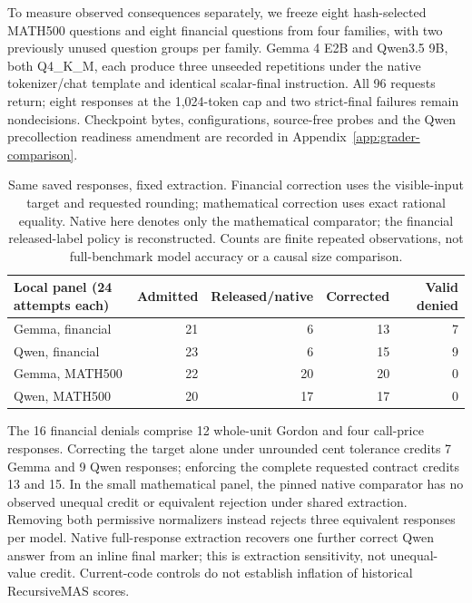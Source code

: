 To measure observed consequences separately, we freeze eight hash-selected MATH500 questions and eight financial questions from four families, with two previously unused question groups per family. Gemma 4 E2B and Qwen3.5 9B, both Q4\_K\_M, each produce three unseeded repetitions under the native tokenizer/chat template and identical scalar-final instruction. All 96 requests return; eight responses at the 1,024-token cap and two strict-final failures remain nondecisions. Checkpoint bytes, configurations, source-free probes and the Qwen precollection readiness amendment are recorded in Appendix~\ref{app:grader-comparison}.

\begin{table}[!ht]
\centering\small
\begin{tabular}{lrrrr}
\toprule
Local panel (24 attempts each) & Admitted & Released/native & Corrected & Valid denied\\
\midrule
Gemma, financial & 21 & 6 & 13 & 7\\
Qwen, financial & 23 & 6 & 15 & 9\\
Gemma, MATH500 & 22 & 20 & 20 & 0\\
Qwen, MATH500 & 20 & 17 & 17 & 0\\
\bottomrule
\end{tabular}
\caption{Same saved responses, fixed extraction. Financial correction uses the visible-input target and requested rounding; mathematical correction uses exact rational equality. Native here denotes only the mathematical comparator; the financial released-label policy is reconstructed. Counts are finite repeated observations, not full-benchmark model accuracy or a causal size comparison.}
\label{tab:local-comparison}
\end{table}

The 16 financial denials comprise 12 whole-unit Gordon and four call-price responses. Correcting the target alone under unrounded cent tolerance credits 7 Gemma and 9 Qwen responses; enforcing the complete requested contract credits 13 and 15. In the small mathematical panel, the pinned native comparator has no observed unequal credit or equivalent rejection under shared extraction. Removing both permissive normalizers instead rejects three equivalent responses per model. Native full-response extraction recovers one further correct Qwen answer from an inline final marker; this is extraction sensitivity, not unequal-value credit. Current-code controls do not establish inflation of historical RecursiveMAS scores.

